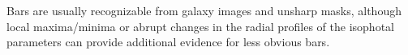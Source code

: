 \documentclass[preprint2]{emulateapj}
\begin{document}
Bars are usually recognizable from galaxy images and unsharp masks, 
although local maxima/minima or abrupt changes in the radial profiles of the isophotal parameters 
can provide additional evidence for less obvious bars. 
\end{document}
